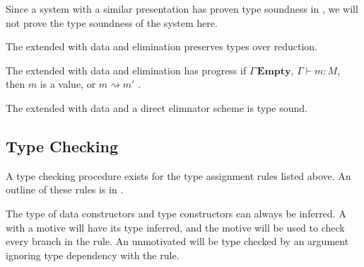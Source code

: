 Since a system with a similar presentation has proven type soundness in \cite{sjoberg2012irrelevance}, we will not prove the type soundness of the system here.

\begin{claim}
The \slang{} extended with data and elimination preserves types over reduction.
\end{claim}

\begin{claim}
The \slang{} extended with data and elimination has progress
if $\Gamma\,\mathbf{Empty}$, \textup{$\Gamma\vdash m:M$}, then $m$
is a value, or $m\rightsquigarrow m'$ .
\end{claim}

\begin{claim}
The \slang{} extended with data and a direct elimnator scheme is type sound.
\end{claim}

\subsection{\Bidir{} Type Checking}

A \bidir{} type checking procedure exists for the type assignment rules listed above.
An outline of these rules is in .

The type of data constructors and type constructors can always be inferred.
A \case{} with a motive will have its type inferred, and the motive will be used to check every branch in the  rule.
An unmotivated \case{} will be type checked by an argument ignoring type dependency with the  rule.

